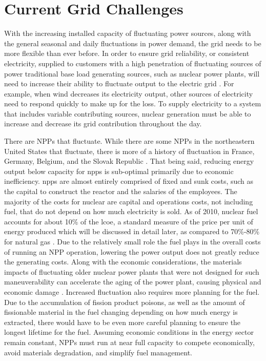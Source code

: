 \documentclass[12pt]{UIdahoMastersThesis}
\begin{document}
\section{Current Grid Challenges}
With the increasing installed capacity of fluctuating power sources, along with the general seasonal and daily fluctuations in power demand, the grid needs to be more flexible than ever before. In order to ensure grid reliability, or consistent electricity, supplied to customers with a high penetration of fluctuating sources of power traditional base load generating sources, such as nuclear power plants, will need to increase their ability to fluctuate output to the electric grid \cite {Denholm2011}. For example, when wind decreases its electricity output, other sources of electricity need to respond quickly to make up for the loss. To supply electricity to a system that includes variable contributing sources, nuclear generation must be able to increase and decrease its grid contribution throughout the day. 

There are NPPs that fluctuate.  While there are some NPPs in the northeastern United States that fluctuate, there is more of a history of fluctuation in France, Germany, Belgium, and the Slovak Republic \cite{Jenkins2018}. That being said, reducing energy output below capacity for \ac{npps} is sub-optimal primarily due to economic inefficiency\cite{Nuclear2011}. \ac{npps} are almost entirely comprised of fixed and sunk costs, such as the capital to construct the reactor and the salaries of the employees. The majority of the costs for nuclear are capital and operations costs, not including fuel, that do not depend on how much electricity is sold. As of 2010, nuclear fuel accounts for about 10\% of the \ac{lcoe}, a standard measure of the price per unit of energy produced which will be discussed in detail later, as compared to 70\%-80\% for natural gas \cite{IEA/NEA}. Due to the relatively small role the fuel plays in the overall costs of running an NPP operation, lowering the power output does not greatly reduce the generating costs. Along with the economic considerations, the materials impacts  of fluctuating older nuclear power plants that were not designed for such maneuverability can accelerate the aging of the power plant, causing physical and economic damage \cite{Nuclear2011}. Increased fluctuation also requires more planning for the fuel.  Due to the accumulation of fission product poisons, as well as the amount of fissionable material in the fuel changing depending on how much energy is extracted, there would have to be even more careful planning to ensure the longest lifetime for the fuel. Assuming economic conditions in the energy sector remain constant, NPPs must run at near full capacity to compete economically, avoid materials degradation, and simplify fuel management.
\end{document}
